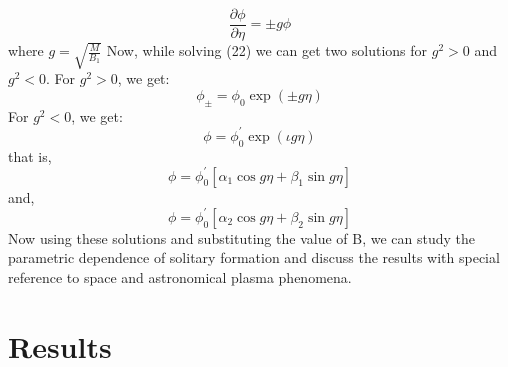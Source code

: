 \documentclass[journal]{IEEEtran}
\begin{document}
\begin{equation}\label{eq22}
\frac{\partial \phi}{\partial \eta}=\pm g \phi
\end{equation}
where $g=\sqrt{\frac{M}{B_1}}$
Now, while solving (22) we can get two solutions for $g^2>0$ and  $g^2<0$.
For $g^2>0$, we get:
\begin{equation}\label{eq23}
\phi_{\pm}=\phi_0\exp{(\pm g\eta)}
\end{equation}
For $g^2<0$, we get:
\begin{equation}\label{eq24}
\phi=\phi_0^{\prime}\exp{(\iota g\eta)}
\end{equation}
that is, 
\begin{equation}\label{eq25}
\phi=\phi_0^{\prime}[\alpha_{1}\cos g\eta + \beta_{1} \sin g\eta]
\end{equation}
and,
\begin{equation}\label{eq26}
\phi=\phi_0^{\prime}[\alpha_{2}\cos g\eta + \beta_{2} \sin g\eta]
\end{equation}
Now using these solutions and substituting the value of B, we can study the parametric dependence of solitary formation and discuss the results with special reference to space and astronomical plasma phenomena. 

\section{Results}\label{IV}
\end{document}
